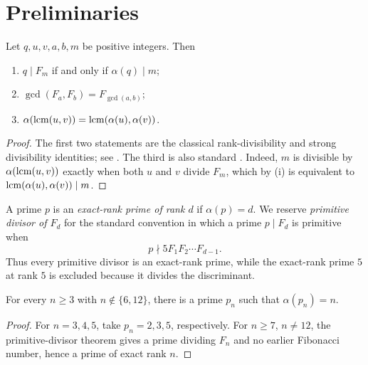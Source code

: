 \section{Preliminaries}\label{sec:prelim}

\begin{proposition}\label{prop:rank-basics}
Let $q,u,v,a,b,m$ be positive integers.  Then
\begin{enumerate}[label=(\roman*)]
\item $q\mid F_m$ if and only if $\alpha(q)\mid m$;
\item $\gcd(F_a,F_b)=F_{\gcd(a,b)}$;
\item $\alpha(\operatorname{lcm}(u,v))=\operatorname{lcm}(\alpha(u),\alpha(v))$.
\end{enumerate}
\end{proposition}

\begin{proof}
The first two statements are the classical rank-divisibility and strong
divisibility identities; see
\cite{Wall1960FibonacciModm,Vinson1963RankApparition}.  The third is also
standard \cite{LucaTron2015SelfFibonacciDivisors}.  Indeed, $m$ is divisible
by $\alpha(\operatorname{lcm}(u,v))$ exactly when both $u$ and $v$ divide $F_m$, which
by (i) is equivalent to
$\operatorname{lcm}(\alpha(u),\alpha(v))\mid m$.
\end{proof}

A prime $p$ is an \emph{exact-rank prime of rank $d$} if $\alpha(p)=d$.
We reserve \emph{primitive divisor of $F_d$} for the standard convention in
which a prime $p\mid F_d$ is primitive when
\[
 p\nmid 5F_1F_2\cdots F_{d-1}.
\]
Thus every primitive divisor is an exact-rank prime, while the exact-rank
prime $5$ at rank $5$ is excluded because it divides the discriminant.

\begin{theorem}
\label{thm:primitive-divisors}
For every $n\geq3$ with $n\notin\{6,12\}$, there is a prime $p_n$ such that
$\alpha(p_n)=n$.
\end{theorem}

\begin{proof}
For $n=3,4,5$, take $p_n=2,3,5$, respectively.  For $n\geq7$,
$n\ne12$, the primitive-divisor theorem
\cite{Carmichael1913PrimitiveDivisors,Yabuta2001PrimitiveDivisorFibonacci,
BiluHanrotVoutier2001PrimitiveDivisorsLucas} gives a prime dividing $F_n$
and no earlier Fibonacci number, hence a prime of exact rank $n$.
\end{proof}


